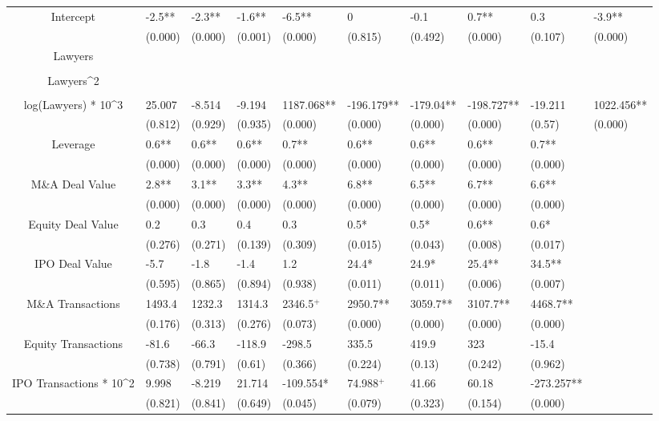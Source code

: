 \documentclass{article}
\begin{document}
\begin{table}[H]
\begin{tabular}{|clllllllll|}
Intercept & -2.5** & -2.3** & -1.6** & -6.5** & 0 & -0.1 & 0.7** & 0.3 & -3.9** \\
   & (0.000) & (0.000) & (0.001) & (0.000) & (0.815) & (0.492) & (0.000) & (0.107) & (0.000) \\
  Lawyers &  &  &  &  &  &  &  &  &  \\
   &  &  &  &  &  &  &  &  &  \\
  Lawyers^2 &  &  &  &  &  &  &  &  &  \\
   &  &  &  &  &  &  &  &  &  \\
  log(Lawyers) * 10^3 & 25.007 & -8.514 & -9.194 & 1187.068** & -196.179** & -179.04** & -198.727** & -19.211 & 1022.456** \\
   & (0.812) & (0.929) & (0.935) & (0.000) & (0.000) & (0.000) & (0.000) & (0.57) & (0.000) \\
  Leverage & 0.6** & 0.6** & 0.6** & 0.7** & 0.6** & 0.6** & 0.6** & 0.7** &  \\
   & (0.000) & (0.000) & (0.000) & (0.000) & (0.000) & (0.000) & (0.000) & (0.000) &  \\
  M\&A Deal Value & 2.8** & 3.1** & 3.3** & 4.3** & 6.8** & 6.5** & 6.7** & 6.6** &  \\
   & (0.000) & (0.000) & (0.000) & (0.000) & (0.000) & (0.000) & (0.000) & (0.000) &  \\
  Equity Deal Value & 0.2 & 0.3 & 0.4 & 0.3 & 0.5* & 0.5* & 0.6** & 0.6* &  \\
   & (0.276) & (0.271) & (0.139) & (0.309) & (0.015) & (0.043) & (0.008) & (0.017) &  \\
  IPO Deal Value & -5.7 & -1.8 & -1.4 & 1.2 & 24.4* & 24.9* & 25.4** & 34.5** &  \\
   & (0.595) & (0.865) & (0.894) & (0.938) & (0.011) & (0.011) & (0.006) & (0.007) &  \\
  M\&A Transactions & 1493.4 & 1232.3 & 1314.3 & 2346.5$^{+}$ & 2950.7** & 3059.7** & 3107.7** & 4468.7** &  \\
   & (0.176) & (0.313) & (0.276) & (0.073) & (0.000) & (0.000) & (0.000) & (0.000) &  \\
  Equity Transactions & -81.6 & -66.3 & -118.9 & -298.5 & 335.5 & 419.9 & 323 & -15.4 &  \\
   & (0.738) & (0.791) & (0.61) & (0.366) & (0.224) & (0.13) & (0.242) & (0.962) &  \\
  IPO Transactions * 10^2 & 9.998 & -8.219 & 21.714 & -109.554* & 74.988$^{+}$ & 41.66 & 60.18 & -273.257** &  \\
   & (0.821) & (0.841) & (0.649) & (0.045) & (0.079) & (0.323) & (0.154) & (0.000) &  \\

\end{tabular}
\end{table}
\end{document}
